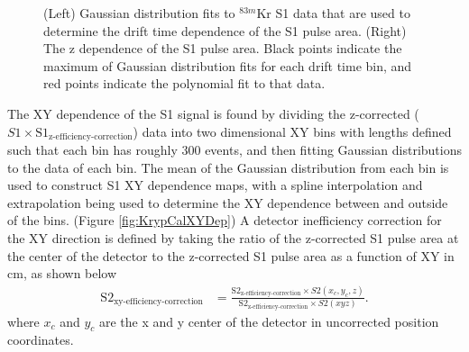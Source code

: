 \documentclass[a4paper,12pt]{article}
\begin{document}
{%
\begin{figure} 
\centering
{}
\qquad
{}
\caption{ (Left) Gaussian distribution fits to $^{83m}$Kr S1 data that are used to determine the drift time dependence of the S1 pulse area. (Right) The z dependence of the S1 pulse area. Black points indicate the maximum of Gaussian distribution fits for each drift time bin, and red points indicate the polynomial fit to that data.}
\label{fig:KrypCal_S1ZDep}
\end{figure}

The XY dependence of the S1 signal is found by dividing the z-corrected ($S1 \times \mbox{S}1_{\mbox{z-efficiency-correction}}$) data into two dimensional XY bins with lengths defined such that each bin has roughly 300 events, and then fitting Gaussian distributions to the data of each bin.  The mean of the Gaussian distribution from each bin is used to construct S1 XY dependence maps, with a spline interpolation and extrapolation being used to determine the XY dependence between and outside of the bins. (Figure \ref{fig:KrypCalXYDep}) A detector inefficiency correction for the XY direction is defined by taking the ratio of the z-corrected S1 pulse area at the center of the detector to the z-corrected S1 pulse area as a function of XY in cm, as shown below
\begin{align}
\mbox{S}2_{\mbox{xy-efficiency-correction}} &= \frac{\mbox{S}2_{\mbox{z-efficiency-correction}}\times S2(x_c,y_c,z)}{\mbox{S}2_{\mbox{z-efficiency-correction}}\times S2(xyz)}.
\end{align} 
where $x_c$ and $y_c$ are the x and y center of the detector in uncorrected position coordinates.

}
\end{document}
